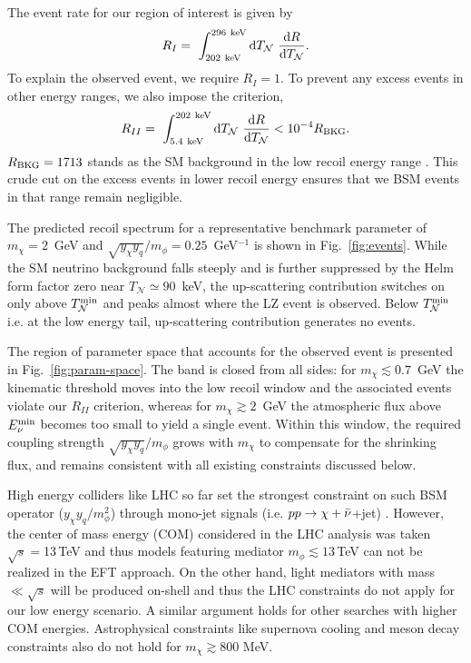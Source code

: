 \documentclass[prd,10pt,twocolumn,nofootinbib,preprint,superscriptaddress]{revtex4}
\def\d{\mathrm{d}}
\newcommand{\nuc}{\mathcal{N}}
\begin{document}
The event rate for our region of interest is given by
\begin{eqnarray}
    R_{I}=~\int_{202{\rm ~keV}}^{296{\rm ~keV}} \mathrm{d}T_\nuc~ \frac{\d R}{\d T_\nuc}.
\end{eqnarray}
To explain the observed event, we require
$R_{I}=1$.
To prevent any excess events in other energy ranges, we also impose the criterion,
\begin{eqnarray}
    R_{II}=~\int_{5.4{\rm ~keV}}^{202{\rm ~keV}} \mathrm{d}T_\nuc~ \frac{\d R}{\d T_\nuc}< 10^{-4} R_{\rm BKG}.
\end{eqnarray}
$R_{\rm BKG}=1713$ stands as the SM background in the low recoil energy range \cite{LZ:2026axp}.
This crude cut on the excess events in lower recoil energy ensures that we BSM events in that range remain negligible. 

The predicted recoil spectrum for a representative benchmark parameter of $m_\chi = 2$~GeV and $\sqrt{y_\chi y_q}/m_\phi = 0.25$~GeV$^{-1}$ is shown in
Fig.~\ref{fig:events}. While the SM neutrino background falls steeply and is
further suppressed by the Helm form factor zero near $T_\nuc \simeq 90$~keV, the
up-scattering contribution switches on only above $T_\nuc^{\rm min}$ and peaks
almost where the LZ event is observed. Below $T_\nuc^{\rm min}$ i.e. at the low energy tail, up-scattering contribution generates no events.


The region of parameter space that accounts for the observed event is presented
in Fig.~\ref{fig:param-space}. The band is closed from all sides: for
$m_\chi \lesssim 0.7$~GeV the kinematic threshold moves into the low recoil
window and the associated events violate our $R_{II}$ criterion, whereas for
$m_\chi \gtrsim 2$~GeV the atmospheric flux above $E_\nu^{\rm min}$ becomes too
small to yield a single event. Within this
window, the required coupling strength $\sqrt{y_\chi y_q}/m_\phi$ grows with $m_\chi$ to
compensate for the shrinking flux, and remains consistent with all existing
constraints discussed below.


High energy colliders like LHC  so far set the strongest constraint on such BSM operator ($y_\chi y_q/m_\phi^2$) through mono-jet signals (i.e. $pp\to \chi+\Bar{\nu}$+jet) \cite{ATLAS:2020uiq}.
However, the center of mass energy (COM) considered in the  LHC analysis was taken $\sqrt{s}=$13\,TeV  and thus models featuring mediator $m_\phi\lesssim 13$\,TeV can not be realized in the EFT approach. On the other hand, light mediators with mass $\ll \sqrt{s}$ will be produced on-shell and %
thus the LHC constraints do not apply for our low energy scenario. 
A similar argument holds for other searches with higher COM energies.
Astrophysical constraints  like supernova cooling \cite{Lin:2025mez} and  meson decay constraints \cite{Liu:2025lbw} also do not hold for $m_\chi\gtrsim 800$ MeV.
\end{document}
